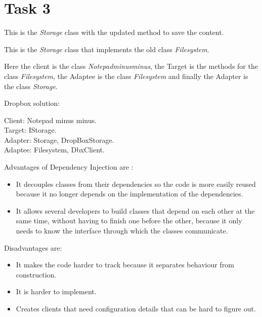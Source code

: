 \chapter{Task 3}
\begin{parlist}
	\item This is the \textit{Storage} class with the updated method to save the content.

This is the \textit{Storage} class that implements the old class \textit{Filesystem}.

	\item Here the client is the class \textit{Notepadminusminus}, the Target is the methods for the class \textit{Filesystem}, the Adaptee is the class \textit{Filesystem} and finally the Adapter is the class \textit{Storage}. 
	\item Dropbox solution:
	
	\item Client: Notepad minus minus.\\ Target: IStorage.\\ Adapter: Storage, DropBoxStorage.\\ Adaptee: Filesystem, DbxClient.
	\item Advantages of Dependency Injection are :
	\begin{itemize}
		\item It decouples classes from their dependencies so the code is more easily reused because it no longer depends on the implementation of the dependencies.
		\item It allows several developers to build classes that depend on each other at the same time, without having to finish one before the other, because it only needs to know the interface through which the classes communicate.
	\end{itemize}
Disadvantages are:
\begin{itemize}
	\item It makes the code harder to track because it separates behaviour from construction.
	\item It is harder to implement.
	\item Creates clients that need configuration details that can be hard to figure out.\cite{wikipediaDependencyInjection}
\end{itemize}
\end{parlist}

